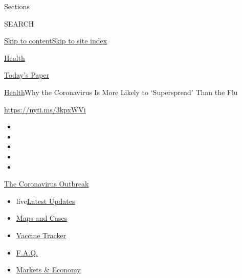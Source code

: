Sections

SEARCH

\protect\hyperlink{site-content}{Skip to
content}\protect\hyperlink{site-index}{Skip to site index}

\href{https://www.nytimes.com/section/health}{Health}

\href{https://myaccount.nytimes.com/auth/login?response_type=cookie\&client_id=vi}{}

\href{https://www.nytimes.com/section/todayspaper}{Today's Paper}

\href{/section/health}{Health}\textbar{}Why the Coronavirus Is More
Likely to `Superspread' Than the Flu

\href{https://nyti.ms/3kpxWVi}{https://nyti.ms/3kpxWVi}

\begin{itemize}
\item
\item
\item
\item
\item
\end{itemize}

\href{https://www.nytimes.com/news-event/coronavirus?action=click\&pgtype=Article\&state=default\&region=TOP_BANNER\&context=storylines_menu}{The
Coronavirus Outbreak}

\begin{itemize}
\tightlist
\item
  live\href{https://www.nytimes.com/2020/08/08/world/coronavirus-updates.html?action=click\&pgtype=Article\&state=default\&region=TOP_BANNER\&context=storylines_menu}{Latest
  Updates}
\item
  \href{https://www.nytimes.com/interactive/2020/us/coronavirus-us-cases.html?action=click\&pgtype=Article\&state=default\&region=TOP_BANNER\&context=storylines_menu}{Maps
  and Cases}
\item
  \href{https://www.nytimes.com/interactive/2020/science/coronavirus-vaccine-tracker.html?action=click\&pgtype=Article\&state=default\&region=TOP_BANNER\&context=storylines_menu}{Vaccine
  Tracker}
\item
  \href{https://www.nytimes.com/interactive/2020/world/coronavirus-tips-advice.html?action=click\&pgtype=Article\&state=default\&region=TOP_BANNER\&context=storylines_menu}{F.A.Q.}
\item
  \href{https://www.nytimes.com/live/2020/08/07/business/stock-market-today-coronavirus?action=click\&pgtype=Article\&state=default\&region=TOP_BANNER\&context=storylines_menu}{Markets
  \& Economy}
\end{itemize}

